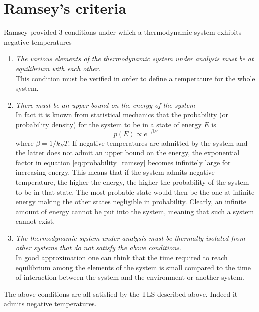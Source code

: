 \section{Ramsey's criteria}
Ramsey \cite{Ramsey} provided 3 conditions under which a thermodynamic system exhibits negative temperatures
\begin{enumerate}
    \item \emph{The various elements of the thermodynamic system under analysis must be at equilibrium with each other}. \\
    This condition must be verified in order to define a temperature for the whole system.
    \item \emph{There must be an upper bound on the energy of the system} \\
    In fact it is known from statistical mechanics that the probability (or probability density) for the system to be in a state of energy $E$ is 
    \begin{equation}
        p(E) \propto e^{-\beta E}
        \label{eq:probability_ramsey}
    \end{equation}
    where $\beta = 1/k_BT$. If negative temperatures are admitted by the system and the latter does not admit an upper bound on the energy, the exponential factor in equation \ref{eq:probability_ramsey}
    becomes infinitely large for increasing energy. This means that if the system admits negative temperature, the higher the energy, the higher the probability of the system to be in that state. The most probable state 
    would then be the one at infinite energy making the other states negligible in probability. Clearly, an infinite amount of energy cannot be put into the system, meaning that such a system cannot exist.
    \item \emph{The thermodynamic system under analysis must be thermally isolated from other systems that do not satisfy the above conditions}. \\
    In good approximation one can think that the time required to reach equilibrium among the elements of the system is small compared to the time of interaction
    between the system and the environment or another system.
\end{enumerate}
The above conditions are all satisfied by the TLS described above. Indeed it admits negative temperatures. \\